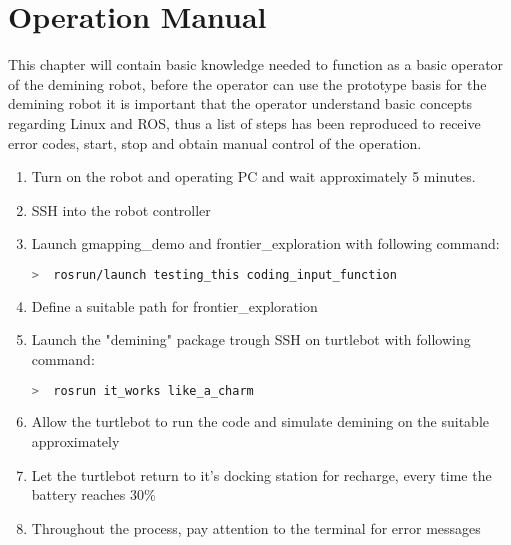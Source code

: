 \chapter{Operation Manual}

This chapter will contain basic knowledge needed to function as a basic operator of the demining robot, before the operator can use the prototype basis for the demining robot it is important that the operator understand basic concepts regarding Linux and ROS, thus a list of steps has been reproduced to receive error codes, start, stop and obtain manual control of the operation.

\begin{enumerate}
    \item Turn on the robot and operating PC and wait approximately 5 minutes.
    \item SSH into the robot controller
    \item Launch gmapping\_demo and frontier\_exploration with following command:\\
        \begin{lstlisting}[language=bash,numbers=none]
  >  rosrun/launch testing_this coding_input_function
        \end{lstlisting}
    \item Define a suitable path for frontier\_exploration
    \item Launch the "demining" package trough SSH on turtlebot with following command:\\
        \begin{lstlisting}[language=bash,numbers=none]
  >  rosrun it_works like_a_charm
        \end{lstlisting}
    \item Allow the turtlebot to run the code and simulate demining on the suitable approximately
    \item Let the turtlebot return to it's docking station for recharge, every time the battery reaches 30\%
    \item Throughout the process, pay attention to the terminal for error messages
\end{enumerate}